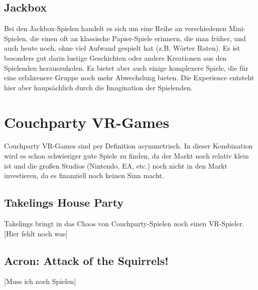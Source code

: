 \subsection{Jackbox}
Bei den Jackbox-Spielen handelt es sich um eine Reihe an verschiedenen Mini-Spielen, die einen oft an klassische Papier-Spiele erinnern, die man früher, und auch heute noch, ohne viel Aufwand gespielt hat (z.B. Wörter Raten). Es ist besonders gut darin lustige Geschichten oder andere Kreationen aus den Spielenden herauszuholen. Es bietet aber auch einige komplexere Spiele, die für eine erfahrenere Gruppe noch mehr Abwechslung bieten. Die Experience entsteht hier aber haupsächlich durch die Imagination der Spielenden.

\section{Couchparty VR-Games}

Couchparty VR-Games sind per Definition asymmetrisch. In dieser Kombination wird es schon schwieriger gute Spiele zu finden, da der Markt noch relativ klein ist und  die großen Studios (Nintendo, EA, etc.) noch nicht in den Markt investieren, da es finanziell noch keinen Sinn macht.

\subsection{Takelings House Party}

Takelings bringt in das Chaos von Couchparty-Spielen noch einen VR-Spieler. [Hier fehlt noch was]

\subsection{Acron: Attack of the Squirrels!}
[Muss ich noch Spielen]